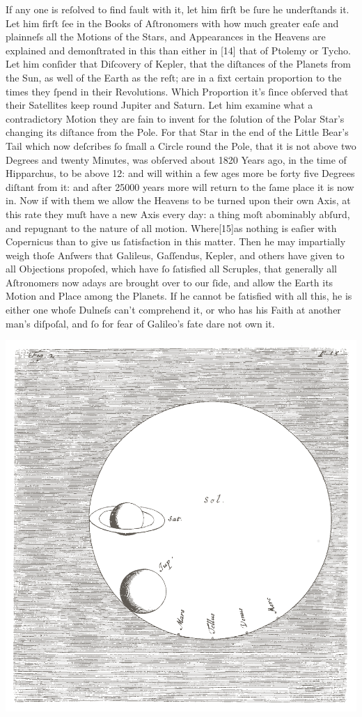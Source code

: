 \documentclass[letterpaper]{book}
\begin{document}
If any one is reſolved to find fault with it, let him firſt be ſure he
underſtands it. Let him firſt ſee in the Books of Aſtronomers with how much
greater eaſe and plainneſs all the Motions of the Stars, and Appearances in
the Heavens are explained and demonſtrated in this than either in [14] that
of Ptolemy or Tycho. Let him conſider that Diſcovery of Kepler, that the
diſtances of the Planets from the Sun, as well of the Earth as the reſt; are
in a fixt certain proportion to the times they ſpend in their Revolutions.
Which Proportion it's ſince obſerved that their Satellites keep round
Jupiter and Saturn. Let him examine what a contradictory Motion they are
fain to invent for the ſolution of the Polar Star's changing its diſtance
from the Pole. For that Star in the end of the Little Bear's Tail which now
deſcribes ſo ſmall a Circle round the Pole, that it is not above two Degrees
and twenty Minutes, was obſerved about 1820 Years ago, in the time of
Hipparchus, to be above 12: and will within a few ages more be forty five
Degrees diſtant from it: and after 25000 years more will return to the ſame
place it is now in. Now if with them we allow the Heavens to be turned upon
their own Axis, at this rate they muſt have a new Axis every day: a thing
moſt abominably abſurd, and repugnant to the nature of all motion.
Where[15]as nothing is eaſier with Copernicus than to give us ſatisfaction
in this matter. Then he may impartially weigh thoſe Anſwers that Galileus,
Gaſſendus, Kepler, and others have given to all Objections propoſed, which
have ſo ſatisfied all Scruples, that generally all Aſtronomers now adays are
brought over to our ſide, and allow the Earth its Motion and Place among the
Planets. If he cannot be ſatisfied with all this, he is either one whoſe
Dulneſs can't comprehend it, or who has his Faith at another man's diſpoſal,
and ſo for fear of Galileo's fate dare not own it.

\begin{center}
	\includegraphics[width=.90 \textwidth]{Images/ct_2_en.jpg}
\end{center}
\end{document}
